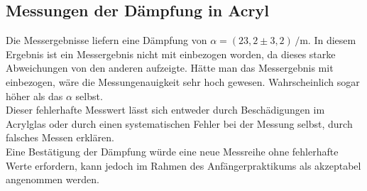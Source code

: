 \subsection{Messungen der Dämpfung in Acryl}

Die Messergebnisse liefern eine Dämpfung von $\alpha = (23,2 \pm 3,2) \, \si{\per\meter}$. In diesem
Ergebnis ist ein Messergebnis nicht mit einbezogen worden, da dieses starke Abweichungen von den anderen
aufzeigte. Hätte man das Messergebnis mit einbezogen, wäre die Messungenauigkeit sehr hoch gewesen. Wahrscheinlich
sogar höher als das $\alpha$ selbst.\\
Dieser fehlerhafte Messwert lässt sich entweder durch Beschädigungen im Acrylglas oder durch einen
systematischen Fehler bei der Messung selbst, durch falsches Messen erklären.\\
Eine Bestätigung der Dämpfung würde eine neue Messreihe ohne fehlerhafte Werte erfordern, kann jedoch
im Rahmen des Anfängerpraktikums als akzeptabel angenommen werden.\\


